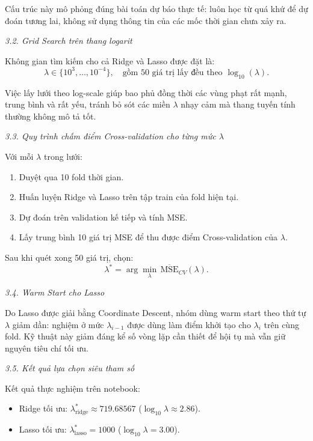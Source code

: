 Cấu trúc này mô phỏng đúng bài toán dự báo thực tế: luôn học từ quá khứ để dự đoán tương lai,
không sử dụng thông tin của các mốc thời gian chưa xảy ra.

\noindent\textcolor{infocolor}{\textit{3.2. Grid Search trên thang logarit}}

Không gian tìm kiếm cho cả Ridge và Lasso được đặt là:
\begin{equation}
\lambda \in \{10^3,\ldots,10^{-4}\},\quad \text{gồm 50 giá trị lấy đều theo }\log_{10}(\lambda).
\end{equation}

Việc lấy lưới theo log-scale giúp bao phủ đồng thời các vùng phạt rất mạnh, trung bình và rất yếu,
tránh bỏ sót các miền $\lambda$ nhạy cảm mà thang tuyến tính thường không mô tả tốt.

\noindent\textcolor{infocolor}{\textit{3.3. Quy trình chấm điểm Cross-validation cho từng mức $\lambda$}}

Với mỗi $\lambda$ trong lưới:
\begin{enumerate} [labelsep=10pt, leftmargin=2cm]
    \item Duyệt qua 10 fold thời gian.
    \item Huấn luyện Ridge và Lasso trên tập train của fold hiện tại.
    \item Dự đoán trên validation kế tiếp và tính MSE.
    \item Lấy trung bình 10 giá trị MSE để thu được điểm Cross-validation của $\lambda$.
\end{enumerate}

Sau khi quét xong 50 giá trị, chọn:
\begin{equation}
\lambda^{\ast}=\arg\min_{\lambda}\,\overline{\text{MSE}}_{CV}(\lambda).
\end{equation}

\noindent\textcolor{infocolor}{\textit{3.4. Warm Start cho Lasso}}

Do Lasso được giải bằng Coordinate Descent, nhóm dùng warm start theo thứ tự $\lambda$ giảm dần:
nghiệm ở mức $\lambda_{i-1}$ được dùng làm điểm khởi tạo cho $\lambda_i$ trên cùng fold.
Kỹ thuật này giảm đáng kể số vòng lặp cần thiết để hội tụ mà vẫn giữ nguyên tiêu chí tối ưu.

\noindent\textcolor{infocolor}{\textit{3.5. Kết quả lựa chọn siêu tham số}}

Kết quả thực nghiệm trên notebook:
\begin{itemize} [labelsep=10pt, leftmargin=2cm]
    \item Ridge tối ưu: $\lambda^{\ast}_{\text{ridge}} \approx 719.68567$ ($\log_{10}\lambda \approx 2.86$).
    \item Lasso tối ưu: $\lambda^{\ast}_{\text{lasso}} = 1000$ ($\log_{10}\lambda = 3.00$).
\end{itemize}

